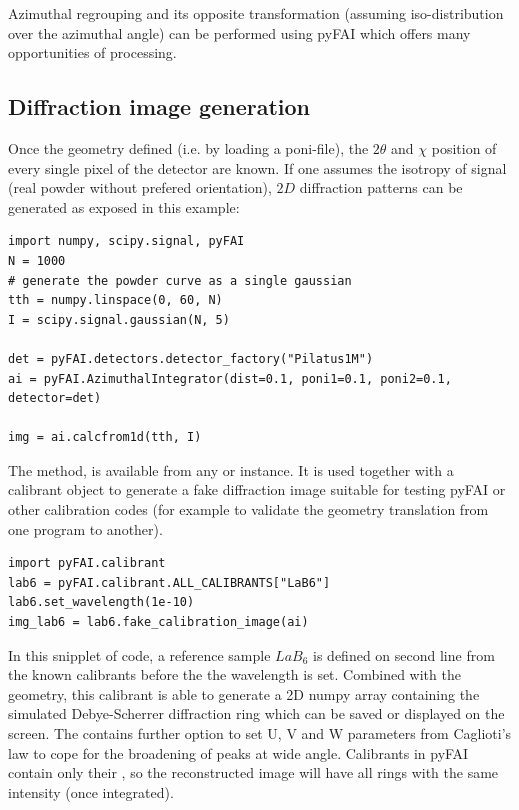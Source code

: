 \documentclass[preprint]{iucr}
\begin{document}
Azimuthal regrouping and its opposite transformation (assuming
iso-distribution over the azimuthal angle) can be performed
using pyFAI which offers many opportunities of processing.

\subsection{Diffraction image generation}

Once the geometry defined (i.e. by loading a poni-file), the $2\theta$ and
$\chi$ position of every single pixel of the detector are known.
If one assumes the isotropy of signal (real powder without prefered
orientation), $2D$ diffraction patterns can be generated as exposed in this
example:

\begin{verbatim}
import numpy, scipy.signal, pyFAI
N = 1000
# generate the powder curve as a single gaussian  
tth = numpy.linspace(0, 60, N)
I = scipy.signal.gaussian(N, 5)

det = pyFAI.detectors.detector_factory("Pilatus1M")
ai = pyFAI.AzimuthalIntegrator(dist=0.1, poni1=0.1, poni2=0.1, detector=det)

img = ai.calcfrom1d(tth, I)
\end{verbatim}


The method,  is available from any
 or  instance. 
It is used together with a calibrant object to generate a fake diffraction image
suitable for testing pyFAI or other calibration codes (for example to validate 
the geometry translation from one program to another).


\begin{verbatim}
import pyFAI.calibrant
lab6 = pyFAI.calibrant.ALL_CALIBRANTS["LaB6"]
lab6.set_wavelength(1e-10)
img_lab6 = lab6.fake_calibration_image(ai)
\end{verbatim}

In this snipplet of code, a reference sample $LaB_6$ is defined on second
line from the known calibrants before the the wavelength is set.
Combined with the geometry, this calibrant is able to 
generate a 2D numpy array containing the simulated Debye-Scherrer diffraction
ring which can be saved or displayed on the screen.
The  contains further option to set U, V and W
parameters from Caglioti's law \cite{caglioti} to cope for the broadening of peaks at wide
angle. 
Calibrants in pyFAI contain only their , so the
reconstructed image will have all rings with the same
intensity (once integrated).
\end{document}
